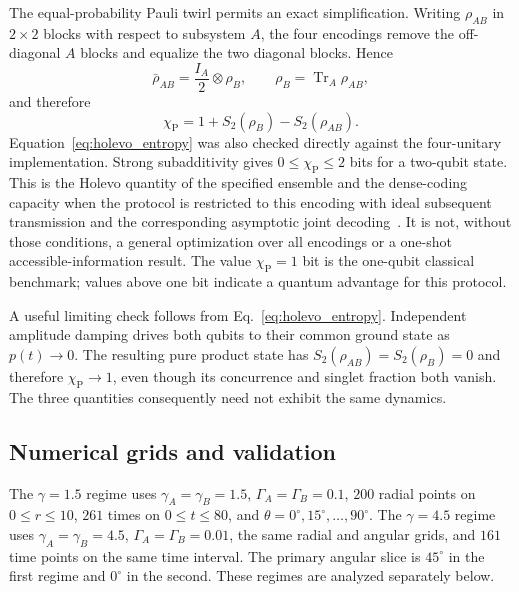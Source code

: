 \documentclass[aps,prb,twocolumn,superscriptaddress,longbibliography]{revtex4-2}
\begin{document}
The equal-probability Pauli twirl permits an exact simplification. Writing
$\rho_{AB}$ in $2\times2$ blocks with respect to subsystem $A$, the four
encodings remove the off-diagonal $A$ blocks and equalize the two diagonal
blocks. Hence
\begin{equation}\boxed{
\bar\rho_{AB}
=
\frac{I_A}{2}\otimes\rho_B,
\qquad
\rho_B=\operatorname{Tr}_A\rho_{AB},
}\label{eq:pauli_average}\end{equation}
and therefore
\begin{equation}\boxed{
\chi_{\mathrm P}
=
1+S_2(\rho_B)-S_2(\rho_{AB}).
}\label{eq:holevo_entropy}\end{equation}
Equation~\eqref{eq:holevo_entropy} was also checked directly against the
four-unitary implementation. Strong subadditivity gives
$0\leq\chi_{\mathrm P}\leq2$ bits for a two-qubit state. This is the Holevo
quantity of the specified ensemble and the dense-coding capacity when the
protocol is restricted to this encoding with ideal subsequent transmission
and the corresponding asymptotic joint decoding~\cite{Bruss2004}. It is not,
without those conditions, a general optimization over all encodings or a
one-shot accessible-information result. The value $\chi_{\mathrm P}=1$ bit is
the one-qubit classical benchmark; values above one bit indicate a quantum
advantage for this protocol.

A useful limiting check follows from Eq.~\eqref{eq:holevo_entropy}. Independent
amplitude damping drives both qubits to their common ground state as
$p(t)\to0$. The resulting pure product state has $S_2(\rho_{AB})=S_2(\rho_B)=0$
and therefore $\chi_{\mathrm P}\to1$, even though its concurrence and singlet
fraction both vanish. The three quantities consequently need not exhibit the
same dynamics.

\subsection{Numerical grids and validation}
\label{sec:validation}

The $\gamma=1.5$ regime uses $\gamma_A=\gamma_B=1.5$,
$\Gamma_A=\Gamma_B=0.1$, $200$ radial points on $0\leq r\leq10$, $261$ times
on $0\leq t\leq80$, and $\theta=0^\circ,15^\circ,\ldots,90^\circ$. The
$\gamma=4.5$ regime uses $\gamma_A=\gamma_B=4.5$, $\Gamma_A=\Gamma_B=0.01$,
the same radial and angular grids, and $161$ time points on the same time
interval. The primary angular slice is $45^\circ$ in the first regime and
$0^\circ$ in the second. These regimes are analyzed separately below.
\end{document}
